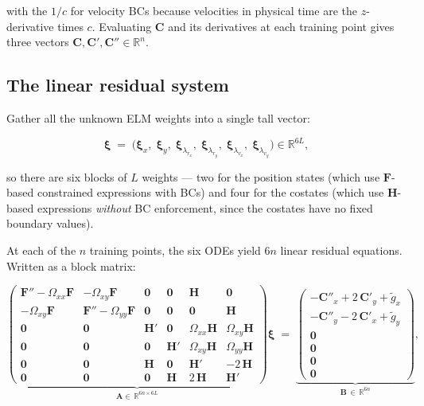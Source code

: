 \documentclass[8pt,a4paper]{article}
\newcommand{\R}{\mathbb{R}}
\newcommand{\bvec}[1]{\bm{#1}}
\newcommand{\Omegaxx}{\Omega_{xx}}
\newcommand{\Omegayy}{\Omega_{yy}}
\newcommand{\Omegaxy}{\Omega_{xy}}
\newcommand{\Amat}{\bvec{A}}
\newcommand{\Bmat}{\bvec{B}}
\newcommand{\Fmat}{\bvec{F}}
\newcommand{\Hmat}{\bvec{H}}
\theoremstyle{definition}
\theoremstyle{remark}
\begin{document}
with the $1/c$ for velocity BCs because velocities in physical time
are the $z$-derivative times $c$. Evaluating $\bvec{C}$ and its
derivatives at each training point gives three vectors $\bvec{C},
\bvec{C}', \bvec{C}'' \in \R^{n}$.

\subsection{The linear residual system}
\label{sec:linear-system}

Gather all the unknown ELM weights into a single tall vector:

\begin{equation}
  \bm{\xi} \;=\; \big(
    \bm{\xi}_{x},\;
    \bm{\xi}_{y},\;
    \bm{\xi}_{\lambda_{r_x}},\;
    \bm{\xi}_{\lambda_{r_y}},\;
    \bm{\xi}_{\lambda_{v_x}},\;
    \bm{\xi}_{\lambda_{v_y}}
  \big) \in \R^{6L},
\end{equation}

so there are six blocks of $L$ weights --- two for the position
states (which use $\Fmat$-based constrained expressions with BCs)
and four for the costates (which use $\Hmat$-based
expressions \emph{without} BC enforcement, since the costates have
no fixed boundary values).

At each of the $n$ training points, the six ODEs yield $6n$ linear
residual equations. Written as a block matrix:

\begin{equation}
  \underbrace{\begin{pmatrix}
    \Fmat'' - \Omegaxx \Fmat & -\Omegaxy \Fmat  & \bm 0   & \bm 0 & \Hmat  & \bm 0  \\
    -\Omegaxy \Fmat & \Fmat'' - \Omegayy \Fmat  & \bm 0   & \bm 0 & \bm 0  & \Hmat  \\
    \bm 0 & \bm 0 & \Hmat' & \bm 0 & \Omegaxx \Hmat & \Omegaxy \Hmat \\
    \bm 0 & \bm 0 & \bm 0 & \Hmat' & \Omegaxy \Hmat & \Omegayy \Hmat \\
    \bm 0 & \bm 0 & \Hmat & \bm 0 & \Hmat' & -2\,\Hmat \\
    \bm 0 & \bm 0 & \bm 0 & \Hmat & 2\,\Hmat & \Hmat'
  \end{pmatrix}}_{\Amat \in\, \R^{6n\times 6L}}
  \bm\xi
  \;=\;
  \underbrace{\begin{pmatrix}
    -\bvec{C}''_x + 2\,\bvec{C}'_y + \tilde g_x \\
    -\bvec{C}''_y - 2\,\bvec{C}'_x + \tilde g_y \\
    \bm 0 \\ \bm 0 \\ \bm 0 \\ \bm 0
  \end{pmatrix}}_{\Bmat\,\in\,\R^{6n}},
\label{eq:linear-system}
\end{equation}
\end{document}
